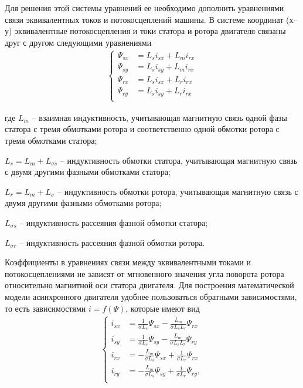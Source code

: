        Для решения этой системы уравнений ее необходимо дополнить уравнениями
        связи эквивалентных токов и потокосцеплений машины. В системе координат
        (х–у) эквивалентные потокосцепления и токи статора и ротора двигателя
        связаны друг с другом следующими уравнениями
        \begin{gather*}
            \left\{
            \begin{aligned}
                \Psi_{sx} & = L_s i_{sx} + L_m i_{rx}\\
                \Psi_{sy} & = L_s i_{sy} + L_m i_{rx}\\
                \Psi_{rx} & = L_s i_{sx} + L_r i_{rx}\\
                \Psi_{ry} & = L_s i_{sy} + L_r i_{rx}\\
            \end{aligned}
            \right.
        \end{gather*}
        
        где $L_m$ -- взаимная индуктивность, учитывающая магнитную связь одной
        фазы статора с тремя обмотками  ротора  и  соответственно  одной
        обмотки  ротора с тремя обмотками статора;

        $L_s=L_m+L_{\sigma s}$ -- индуктивность обмотки статора,
        учитывающая магнитную связь с двумя другими фазными обмотками
        статора;
        
        $L_r=L_m+L_{\sigma}$ -- индуктивность обмотки ротора, учитывающая
        магнитную связь с двумя другими фазными обмотками ротора;

        $L_{\sigma s}$ -- индуктивность рассеяния фазной обмотки статора;

        $L_{\sigma r}$ -- индуктивность рассеяния фазной обмотки ротора.

        Коэффициенты в уравнениях связи между эквивалентными токами и
        потокосцеплениями не зависят от мгновенного значения угла поворота
        ротора относительно магнитной оси статора двигателя. Для построения
        математической модели асинхронного двигателя удобнее пользоваться
        обратными зависимостями, то есть зависимостями $i=f(\Psi)$, которые
        имеют вид
        \begin{gather*}
            \left\{
            \begin{aligned}
                i_{sx} & =\frac{1}{\sigma L_s}\Psi_{sx}-
                    \frac{L_m}{\sigma L_s L_r}\Psi_{rx}\\
                i_{sy} & =\frac{1}{\sigma L_s}\Psi_{sy}-
                    \frac{L_m}{\sigma L_s L_r}\Psi_{ry}\\
                i_{rx} & =-\frac{L_m}{\sigma L_s}\Psi_{sx}+
                    \frac{1}{\sigma L_r}\Psi_{rx}\\
                i_{ry} & =-\frac{L_m}{\sigma L_s}\Psi_{sy}+
                    \frac{1}{\sigma L_r}\Psi_{ry},\\
            \end{aligned}
            \right.
        \end{gather*}

